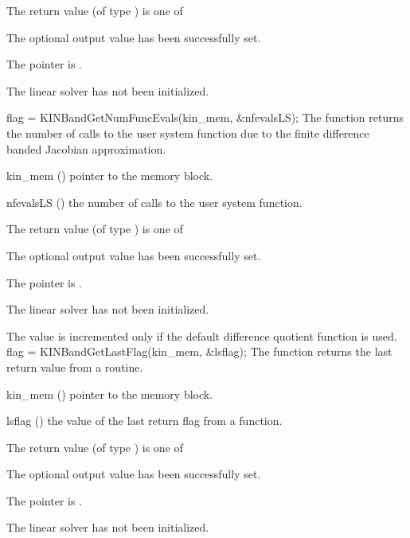 {
  The return value  (of type ) is one of
  \begin{args}
  \item[\Id{KINBAND\_SUCCESS}] 
    The optional output value has been successfully set.
  \item[\Id{KINBAND\_MEM\_NULL}]
    The  pointer is .
  \item[\Id{KINBAND\_LMEM\_NULL}]
    The {\kinband} linear solver has not been initialized.
  \end{args}
}
{}
{
  flag = KINBandGetNumFuncEvals(kin\_mem, \&nfevalsLS);
}
{
  The function  returns the
  number of calls to the user system function due to the 
  finite difference banded Jacobian approximation.
}
{
  \begin{args}
  \item[kin\_mem] ()
    pointer to the {\cvode} memory block.
  \item[nfevalsLS] ()
    the number of calls to the user system function.
  \end{args}
}
{
  The return value  (of type ) is one of
  \begin{args}
  \item[\Id{KINBAND\_SUCCESS}] 
    The optional output value has been successfully set.
  \item[\Id{KINBAND\_MEM\_NULL}]
    The  pointer is .
  \item[\Id{KINBAND\_LMEM\_NULL}]
    The {\kinband} linear solver has not been initialized.
  \end{args}
}
{
  The value  is incremented only if the default 
   difference quotient function is used.
}
{
  flag = KINBandGetLastFlag(kin\_mem, \&lsflag);
}
{
  The function  returns the
  last return value from a {\kinband} routine. 
}
{
  \begin{args}
  \item[kin\_mem] ()
    pointer to the {\cvode} memory block.
  \item[lsflag] ()
    the value of the last return flag from a {\kinband} function.
  \end{args}
}
{
  The return value  (of type ) is one of
  \begin{args}
  \item[\Id{KINBAND\_SUCCESS}] 
    The optional output value has been successfully set.
  \item[\Id{KINBAND\_MEM\_NULL}]
    The  pointer is .
  \item[\Id{KINBAND\_LMEM\_NULL}]
    The {\kinband} linear solver has not been initialized.
  \end{args}
}
